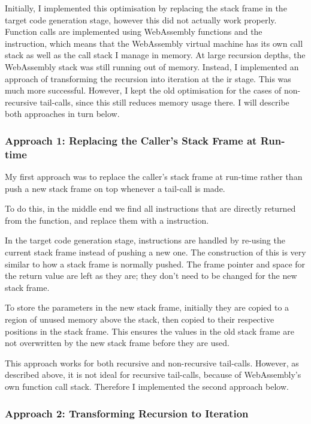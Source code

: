 \documentclass[00-main.tex]{subfiles}
\begin{document}
Initially, I implemented this optimisation by replacing the stack frame in the target code generation stage, however this did not actually work properly.
Function calls are implemented using WebAssembly functions and the  instruction, which means that the WebAssembly virtual machine has its own call stack as well as the call stack I manage in memory.
At large recursion depths, the WebAssembly stack was still running out of memory.
Instead, I implemented an approach of transforming the recursion into iteration at the \gls{ir} stage.
This was much more successful.
However, I kept the old optimisation for the cases of non-recursive tail-calls, since this still reduces memory usage there.
I will describe both approaches in turn below.

\subsubsection{Approach 1: Replacing the Caller's Stack Frame at Run-time}

My first approach was to replace the caller's stack frame at run-time rather than push a new stack frame on top whenever a tail-call is made.

To do this, in the middle end we find all  instructions that are directly returned from the function, and replace them with a  instruction.

In the target code generation stage,  instructions are handled by re-using the current stack frame instead of pushing a new one.
The construction of this is very similar to how a stack frame is normally pushed.
The frame pointer and space for the return value are left as they are; they don't need to be changed for the new stack frame.

To store the parameters in the new stack frame, initially they are copied to a region of unused memory above the stack, then copied to their respective positions in the stack frame. This ensures the values in the old stack frame are not overwritten by the new stack frame before they are used.

This approach works for both recursive and non-recursive tail-calls.
However, as described above, it is not ideal for recursive tail-calls, because of WebAssembly's own function call stack.
Therefore I implemented the second approach below.

\subsubsection{Approach 2: Transforming Recursion to Iteration}
\end{document}
